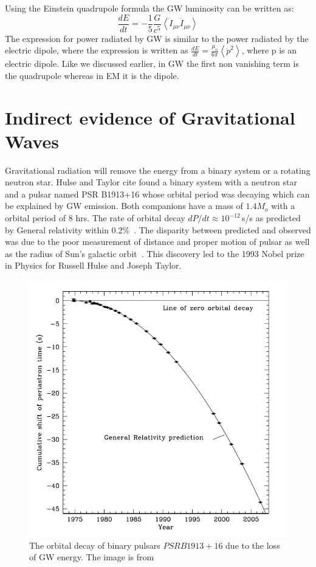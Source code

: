 \documentclass{ttuthes2007}
\begin{document}
Using the Einstein quadrupole formula the \ac{GW} luminosity can be written
as:
\begin{equation}
\frac{dE}{dt} =
-\frac{1}{5}\frac{G}{c^5}\left\langle\dddot{I}_{\mu\nu}\dddot{I}_{\mu\nu}\right\rangle
\end{equation}
The expression for power radiated by \ac{GW} is similar to the power radiated by the electric
dipole, where the expression is written as
$\frac{dE}{dt}=\frac{\mu_o}{6\pi}\left\langle \ddot{p}^2\right\rangle$, where p is an electric
dipole. Like we discussed earlier, in \ac{GW} the first non vanishing term is
the quadrupole whereas in \ac{EM} it is the dipole.

\section{Indirect evidence of Gravitational Waves}
	
Gravitational radiation will remove the energy from a binary system or a
rotating neutron star. Hulse and Taylor cite found a binary system with a
neutron star and a pulsar named PSR B1913+16 whose orbital period was decaying which
can be explained by \acl{GW} emission. Both companions have a mass of $1.4 M_o$
with a orbital period of 8 hrs. The rate of orbital decay
$dP/dt\approx10^{-12}$\,s/s 
as predicted by General relativity within 0.2\%~\cite{1975ApJ...195L..51H}. The disparity between predicted
and observed was due to the poor measurement of distance and proper motion of
pulsar as well as the radius of Sun's galactic orbit~\cite{Weisberg_2010}. This discovery led to
the 1993 Nobel prize in Physics for Russell Hulse and Joseph Taylor.
\begin{figure}[bht!]
	\includegraphics[width=\textwidth]{figure/pulsar.png}
	\caption{The orbital decay of binary pulsars $ PSR B1913+16$ due to the
loss of \ac{GW} energy. The image is from \cite{Weisberg_2010}}
\end{figure}  
\end{document}
